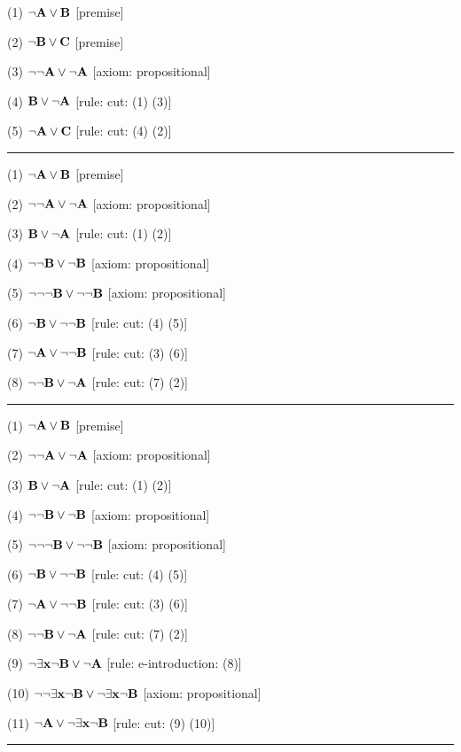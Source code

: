 \item{(1)} $\neg {\bf A} \lor {\bf B}$ \hfill [premise]
\item{(2)} $\neg {\bf B} \lor {\bf C}$ \hfill [premise]
\item{(3)} $\neg \neg {\bf A} \lor \neg {\bf A}$ \hfill [axiom: propositional]
\item{(4)} ${\bf B} \lor \neg {\bf A}$ \hfill [rule: cut: (1) (3)]
\item{(5)} $\neg {\bf A} \lor {\bf C}$ \hfill [rule: cut: (4) (2)]
\medskip
\hrule
\medskip
\item{(1)} $\neg {\bf A} \lor {\bf B}$ \hfill [premise]
\item{(2)} $\neg \neg {\bf A} \lor \neg {\bf A}$ \hfill [axiom: propositional]
\item{(3)} ${\bf B} \lor \neg {\bf A}$ \hfill [rule: cut: (1) (2)]
\item{(4)} $\neg \neg {\bf B} \lor \neg {\bf B}$ \hfill [axiom: propositional]
\item{(5)} $\neg \neg \neg {\bf B} \lor \neg \neg {\bf B}$ \hfill [axiom: propositional]
\item{(6)} $\neg {\bf B} \lor \neg \neg {\bf B}$ \hfill [rule: cut: (4) (5)]
\item{(7)} $\neg {\bf A} \lor \neg \neg {\bf B}$ \hfill [rule: cut: (3) (6)]
\item{(8)} $\neg \neg {\bf B} \lor \neg {\bf A}$ \hfill [rule: cut: (7) (2)]
\medskip
\hrule
\medskip
\item{(1)} $\neg {\bf A} \lor {\bf B}$ \hfill [premise]
\item{(2)} $\neg \neg {\bf A} \lor \neg {\bf A}$ \hfill [axiom: propositional]
\item{(3)} ${\bf B} \lor \neg {\bf A}$ \hfill [rule: cut: (1) (2)]
\item{(4)} $\neg \neg {\bf B} \lor \neg {\bf B}$ \hfill [axiom: propositional]
\item{(5)} $\neg \neg \neg {\bf B} \lor \neg \neg {\bf B}$ \hfill [axiom: propositional]
\item{(6)} $\neg {\bf B} \lor \neg \neg {\bf B}$ \hfill [rule: cut: (4) (5)]
\item{(7)} $\neg {\bf A} \lor \neg \neg {\bf B}$ \hfill [rule: cut: (3) (6)]
\item{(8)} $\neg \neg {\bf B} \lor \neg {\bf A}$ \hfill [rule: cut: (7) (2)]
\item{(9)} $\neg \exists {\bf x} \neg {\bf B} \lor \neg {\bf A}$ \hfill [rule: e-introduction: (8)]
\item{(10)} $\neg \neg \exists {\bf x} \neg {\bf B} \lor \neg \exists {\bf x} \neg {\bf B}$ \hfill [axiom: propositional]
\item{(11)} $\neg {\bf A} \lor \neg \exists {\bf x} \neg {\bf B}$ \hfill [rule: cut: (9) (10)]
\medskip
\hrule
\medskip

\vfill
\break

